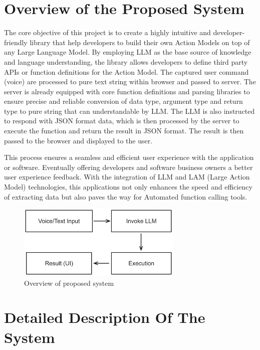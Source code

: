 \section{Overview of the Proposed System}

\noindent The core objective of this project is to create a highly intuitive and developer-friendly library that help developers to build their own Action Models on top of any Large Language Model. By employing LLM as the base source of knowledge and language understanding, the library allows developers to define third party APIs or function definitions for the Action Model. The captured user command (voice) are processed to pure text string within browser and passed to server. The server is already equipped with core function definitions and parsing libraries to ensure precise and reliable conversion of data type, argument type and return type to pure string that can understandable by LLM. The LLM is also instructed to respond with JSON format data, which is then processed by the server to execute the function and return the result in JSON format. The result is then passed to the browser and displayed to the user.

\noindent This process ensures a seamless and efficient user experience with the application or software. Eventually offering developers and software business owners a better user experience feedback. With the integration of LLM and LAM (Large Action Model) technologies, this applications not only enhances the speed and efficiency of extracting data but also paves the way for Automated function calling tools.

\begin{figure}[htbp]
  \centering
  \includegraphics[width=0.7\textwidth]{Images/prop_sys/overview_prop_sys.png}
  \caption{Overview of proposed system}
\end{figure}

\clearpage

\section{Detailed Description Of The System}

